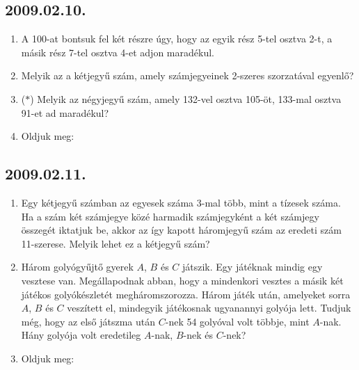 \subsection*{2009.02.10.}
\begin{enumerate}
\item A 100-at bontsuk fel két részre úgy, hogy az egyik rész 5-tel osztva 2-t, a másik rész 7-tel osztva 4-et adjon maradékul.
\item Melyik az a kétjegyű szám, amely számjegyeinek 2-szeres szorzatával egyenlő?
\item ($*$) Melyik az négyjegyű szám, amely 132-vel osztva 105-öt, 133-mal 
osztva 91-et ad maradékul?
\item Oldjuk meg:
\end{enumerate}


\subsection*{2009.02.11.}
\begin{enumerate}
\item Egy kétjegyű számban az egyesek száma 3-mal több, mint a tízesek száma.
Ha a szám két számjegye közé harmadik számjegyként a két számjegy összegét iktatjuk be, akkor az így kapott háromjegyű szám az eredeti szám 11-szerese.
Melyik lehet ez a kétjegyű szám?
\item Három golyógyűjtő gyerek $A$, $B$ és $C$ játszik. 
Egy játéknak mindig egy vesztese van. Megállapodnak abban, hogy a mindenkori 
vesztes a másik két játékos golyókészletét megháromszorozza. Három játék után,
amelyeket sorra $A$, $B$ és $C$ veszített el, mindegyik játékosnak ugyanannyi golyója lett. Tudjuk még, hogy az első játszma után $C$-nek 54 golyóval volt 
többje, mint $A$-nak. Hány golyója volt eredetileg $A$-nak, $B$-nek és $C$-nek?
\item Oldjuk meg:
\end{enumerate}


